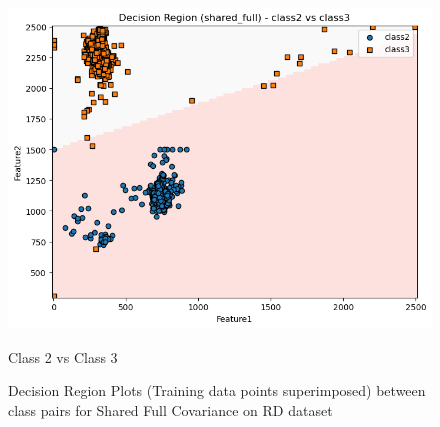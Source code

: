 \begin{figure}[H]
\begin{minipage}{0.32\linewidth}
        \includegraphics[width=\linewidth]{images/RD_Group04_images/02_shared_full/04_decision_region_c2_c3.png}
        \caption*{Class 2 vs Class 3}
    \end{minipage}
    \caption{Decision Region Plots (Training data points superimposed) between class pairs for Shared Full Covariance on RD dataset}
\end{figure}